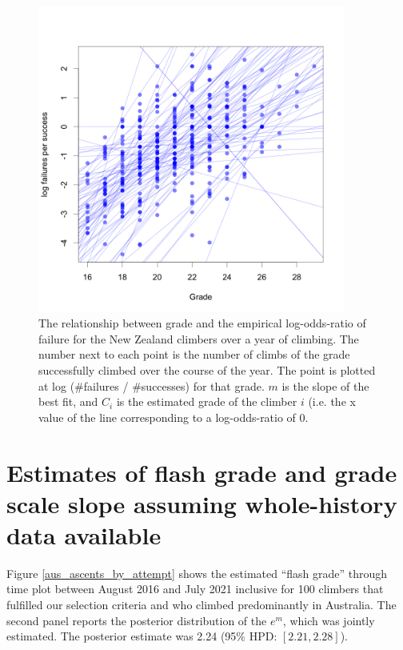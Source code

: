 \documentclass[11pt]{article}
\begin{document}
\begin{figure}
\centering
\includegraphics[width=0.9\textwidth]{../results/nz/ascents-from-2016-08-01-to-2021-08-01-minAscents30-minFails1-Sport-AU-session-regression.png}
\caption{\small The relationship between grade and the empirical log-odds-ratio of failure for the New Zealand climbers over a year of climbing. The number next to each point is the number of climbs of the grade successfully climbed over the course of the year. The point is plotted at log (\#failures / \#successes) for that grade. $m$ is the slope of the best fit, and $C_i$ is the estimated grade of the climber $i$ (i.e. the x value of the line corresponding to a log-odds-ratio of 0.}
\label{fig2}
\end{figure}

\section{Estimates of flash grade and grade scale slope assuming whole-history data available}

Figure \ref{aus_ascents_by_attempt} shows the estimated ``flash grade'' through time plot between August 2016 and July 2021 inclusive for 100 climbers that fulfilled our selection criteria and who climbed predominantly in Australia. The second panel reports the posterior distribution of the $e^m$, which was jointly estimated. The posterior estimate was 2.24 (95\% HPD:  $[2.21, 2.28]$).
\end{document}
